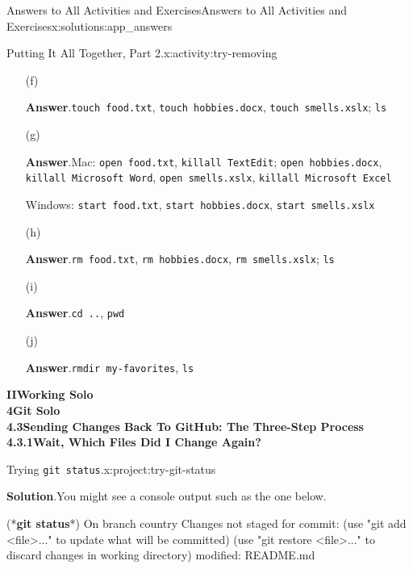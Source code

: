 \documentclass[oneside,10pt,]{book}
\newcommand{\blocktitlefont}{\relax}
\newcommand{\mono}[1]{\texttt{#1}}
\newcommand{\consoleinput}[1]{\textbf{#1}}
\begin{document}
\begin{solutions-chapter}{Answers to All Activities and Exercises}{}{Answers to All Activities and Exercises}{}{}{x:solutions:app_answers}
\begin{activitysolution}{2.3}{Putting It All Together, Part 2.}{x:activity:try-removing}
\begin{enumerate}[font=\bfseries,label=(\alph*),ref=\alph*]
\item[(f)]\par\smallskip%
\noindent\textbf{\blocktitlefont Answer}.\hypertarget{g:answer:idp615601816-back}{}\quad{}\mono{touch food.txt}, \mono{touch hobbies.docx}, \mono{touch smells.xslx}; \mono{ls}%
\item[(g)]\par\smallskip%
\noindent\textbf{\blocktitlefont Answer}.\hypertarget{g:answer:idp615609496-back}{}\quad{}Mac: \mono{open food.txt}, \mono{killall TextEdit}; \mono{open hobbies.docx}, \mono{killall \textquotesingle{}Microsoft Word\textquotesingle{}}, \mono{open smells.xslx}, \mono{killall \textquotesingle{}Microsoft Excel\textquotesingle{}}%
\par
Windows: \mono{start food.txt}, \mono{start hobbies.docx}, \mono{start smells.xslx}%
\item[(h)]\par\smallskip%
\noindent\textbf{\blocktitlefont Answer}.\hypertarget{g:answer:idp615605784-back}{}\quad{}\mono{rm food.txt}, \mono{rm hobbies.docx}, \mono{rm smells.xslx}; \mono{ls}%
\item[(i)]\par\smallskip%
\noindent\textbf{\blocktitlefont Answer}.\hypertarget{g:answer:idp615611288-back}{}\quad{}\mono{cd ..}, \mono{pwd}%
\item[(j)]\par\smallskip%
\noindent\textbf{\blocktitlefont Answer}.\hypertarget{g:answer:idp615615896-back}{}\quad{}\mono{rmdir my-favorites}, \mono{ls}%
\end{enumerate}
\end{activitysolution}%
\par\medskip
\noindent\textbf{\Large{}II\space\textperiodcentered\space{}Working Solo\\
4\space\textperiodcentered\space{}Git Solo\\
4.3\space\textperiodcentered\space{}Sending Changes Back To GitHub: The Three-Step Process\\
4.3.1\space\textperiodcentered\space{}Wait, Which Files Did I Change Again?}
\begin{projectsolution}{4.4}{Trying \mono{git status}.}{x:project:try-git-status}%
\par\smallskip%
\noindent\textbf{\blocktitlefont Solution}.\hypertarget{g:solution:idp616203272-back}{}\quad{}You might see a console output such as the one below.%
\begin{console}{0}{1}{0}
(*\consoleinput{git status}*)
On branch country
Changes not staged for commit:
  (use "git add <file>..." to update what will be committed)
  (use "git restore <file>..." to discard changes in working directory)
        modified:   README.md


\end{console}
\end{projectsolution}
\end{solutions-chapter}
\end{document}
